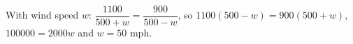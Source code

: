 With wind speed $w$: $\dfrac{1100}{500+w}=\dfrac{900}{500-w}$, so $1100(500-w)=900(500+w)$, $100000=2000w$ and $w=\boxed{50\text{ mph}}$.
